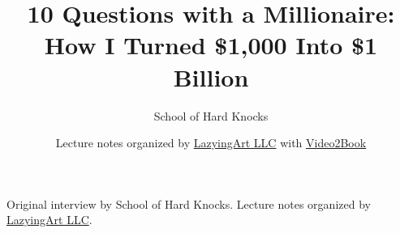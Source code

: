 \documentclass[11pt,oneside]{book}
\begin{document}
\frontmatter
\title{10 Questions with a Millionaire: How I Turned \$1,000 Into \$1 Billion}
\author{School of Hard Knocks}
\date{Lecture notes organized by \href{https://lazying.art}{LazyingArt LLC} with \href{https://github.com/lachlanchen/Video2Book}{Video2Book}}
\maketitle
\begin{center}
\small Original interview by School of Hard Knocks. Lecture notes organized by \href{https://lazying.art}{LazyingArt LLC}.
\end{center}
\clearpage
\mainmatter

\end{document}
